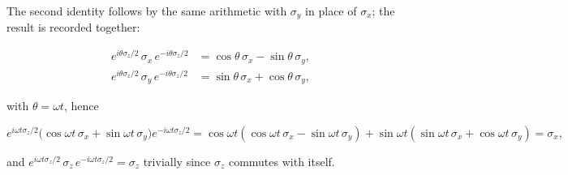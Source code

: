 The second identity follows by the same arithmetic with $\sigma_y$ in place of $\sigma_x$; the result is recorded together:
\begin{linenomath}
    \begin{align*}
        e^{i\theta\sigma_z/2}\,\sigma_x\,e^{-i\theta\sigma_z/2}
        &= \cos\theta\,\sigma_x - \sin\theta\,\sigma_y, \\
        e^{i\theta\sigma_z/2}\,\sigma_y\,e^{-i\theta\sigma_z/2}
        &= \sin\theta\,\sigma_x + \cos\theta\,\sigma_y,
    \end{align*}
\end{linenomath}
with $\theta=\omega t$, hence
\begin{linenomath}
    \begin{equation*}
        e^{i\omega t\sigma_z/2}\bigl(\cos\omega t\,\sigma_x + \sin\omega t\,\sigma_y\bigr)e^{-i\omega t\sigma_z/2}
        = \cos\omega t(\cos\omega t\,\sigma_x - \sin\omega t\,\sigma_y)
          + \sin\omega t(\sin\omega t\,\sigma_x + \cos\omega t\,\sigma_y)
        = \sigma_x,
    \end{equation*}
\end{linenomath}
and $e^{i\omega t\sigma_z/2}\,\sigma_z\,e^{-i\omega t\sigma_z/2} = \sigma_z$ trivially since $\sigma_z$ commutes with itself.

